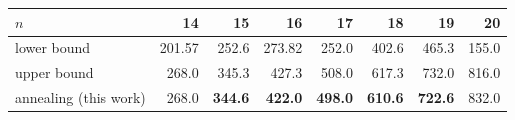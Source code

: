 \begin{tabular}{@{}lrrrrrrr@{}}
\toprule
$n$ & 14 & 15 & 16 & 17 & 18 & 19 & 20 \\
\midrule
lower bound \citep{MirkaEtAl2023} & 201.57 & 252.6 & 273.82 & 252.0 & 402.6 & 465.3 & 155.0 \\
upper bound \citep{MirkaEtAl2023} & 268.0 & 345.3 & 427.3 & 508.0 & 617.3 & 732.0 & 816.0 \\
annealing (this work)             & 268.0 & \textbf{344.6} & \textbf{422.0} & \textbf{498.0} & \textbf{610.6} & \textbf{722.6} & 832.0 \\
\bottomrule
\end{tabular}
